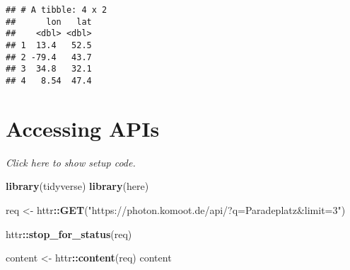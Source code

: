 \documentclass[]{book}
\newenvironment{Shaded}{\begin{snugshade}}{\end{snugshade}}
\newcommand{\KeywordTok}[1]{\textcolor[rgb]{0.13,0.29,0.53}{\textbf{#1}}}
\newcommand{\NormalTok}[1]{#1}
\newcommand{\OperatorTok}[1]{\textcolor[rgb]{0.81,0.36,0.00}{\textbf{#1}}}
\newcommand{\StringTok}[1]{\textcolor[rgb]{0.31,0.60,0.02}{#1}}
\begin{document}
\begin{verbatim}
## # A tibble: 4 x 2
##      lon   lat
##    <dbl> <dbl>
## 1  13.4   52.5
## 2 -79.4   43.7
## 3  34.8   32.1
## 4   8.54  47.4
\end{verbatim}

\hypertarget{accessing-apis}{%
\section{Accessing APIs}\label{accessing-apis}}

\emph{Click here to show setup code.}

\begin{Shaded}
\begin{Highlighting}[]
\KeywordTok{library}\NormalTok{(tidyverse)}
\KeywordTok{library}\NormalTok{(here)}
\end{Highlighting}
\end{Shaded}

\begin{Shaded}
\begin{Highlighting}[]
\NormalTok{req <-}\StringTok{ }\NormalTok{httr}\OperatorTok{::}\KeywordTok{GET}\NormalTok{(}\StringTok{"https://photon.komoot.de/api/?q=Paradeplatz&limit=3"}\NormalTok{)}
\end{Highlighting}
\end{Shaded}

\begin{Shaded}
\begin{Highlighting}[]
\NormalTok{httr}\OperatorTok{::}\KeywordTok{stop_for_status}\NormalTok{(req)}
\end{Highlighting}
\end{Shaded}

\begin{Shaded}
\begin{Highlighting}[]
\NormalTok{content <-}\StringTok{ }\NormalTok{httr}\OperatorTok{::}\KeywordTok{content}\NormalTok{(req)}
\NormalTok{content}
\end{Highlighting}
\end{Shaded}
\end{document}
